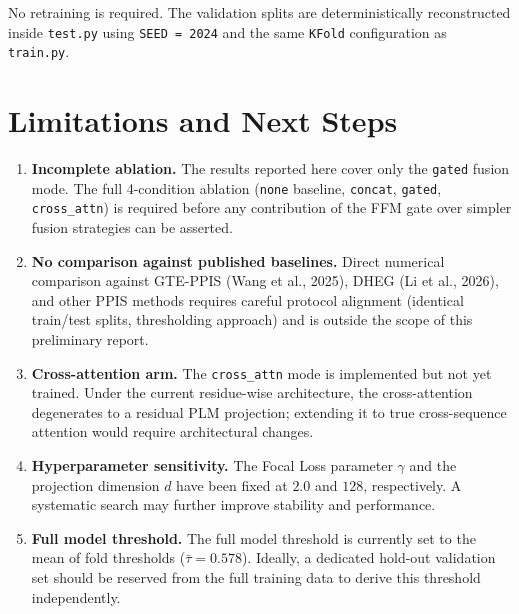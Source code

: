 \documentclass[11pt,a4paper]{article}
\begin{document}
No retraining is required. The validation splits are deterministically reconstructed
inside \texttt{test.py} using \texttt{SEED = 2024} and the same \texttt{KFold}
configuration as \texttt{train.py}.

\section{Limitations and Next Steps}

\begin{enumerate}
    \item \textbf{Incomplete ablation.} The results reported here cover only the
          \texttt{gated} fusion mode. The full 4-condition ablation
          (\texttt{none} baseline, \texttt{concat}, \texttt{gated},
          \texttt{cross\_attn}) is required before any contribution of the FFM gate
          over simpler fusion strategies can be asserted.

    \item \textbf{No comparison against published baselines.} Direct numerical
          comparison against GTE-PPIS (Wang et al., 2025), DHEG (Li et al., 2026),
          and other PPIS methods requires careful protocol alignment (identical
          train/test splits, thresholding approach) and is outside the scope of
          this preliminary report.

    \item \textbf{Cross-attention arm.} The \texttt{cross\_attn} mode is implemented
          but not yet trained. Under the current residue-wise architecture, the
          cross-attention degenerates to a residual PLM projection; extending it
          to true cross-sequence attention would require architectural changes.

    \item \textbf{Hyperparameter sensitivity.} The Focal Loss parameter $\gamma$
          and the projection dimension $d$ have been fixed at $2.0$ and $128$,
          respectively. A systematic search may further improve stability and
          performance.

    \item \textbf{Full model threshold.} The full model threshold is currently set
          to the mean of fold thresholds ($\bar{\tau} = 0.578$). Ideally, a
          dedicated hold-out validation set should be reserved from the full
          training data to derive this threshold independently.
\end{enumerate}
\end{document}
